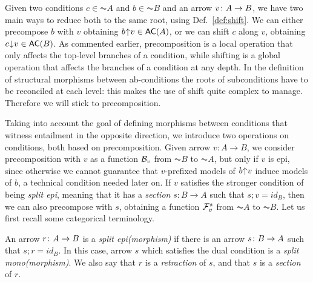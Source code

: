 Given two conditions $c\in \AC{A}$ and $b\in \AC{B}$ and an arrow $v\colon A \rightarrow B$, we have two main ways to reduce both to the same root, using Def.~\ref{def:shift}. We can either precompose $b$ with $v$ obtaining $\bshift{b}{v}\in \AC{A}$, or we can shift $c$ along $v$, obtaining $\shift{c}{v}\in \AC{B}$. As commented earlier, precomposition is a local operation that only affects the top-level branches of a condition, while shifting is a global operation that affects the branches of a condition at any depth. In the definition of structural morphisms between ab-conditions the roots of subconditions have to be reconciled at each level: this makes the use of shift quite complex to manage. Therefore we will stick to precomposition. 

Taking into account the goal of defining morphisms between conditions that witness entailment in the opposite direction, we introduce two operations on conditions, both based on precomposition. 
Given arrow $v:A\to B$, we consider precomposition with $v$ as a function $\mathcal{B}_v$ from $\AC{B}$ to $\AC{A}$, but only if $v$ is epi, since otherwise we cannot guarantee that $v$-prefixed models of ${b}{\mskip1mu\uparrow\mskip1mu}{v}$  induce models of $b$, a technical condition needed later on. If $v$ satisfies the stronger condition of being \emph{split epi}, meaning that it has a \emph{section} $s : B \to A$ such that $s;v= id_B$, then we can also precompose with $s$, obtaining a function $\mathcal{F}^s_v$ from $\AC{A}$ to $\AC{B}$. Let us first recall some categorical terminology.

\begin{definition}\label{def:retraction}
  An arrow $r\colon A \rightarrow B$  is a \emph{split epi(morphism)} if there is an arrow $s\colon B\rightarrow A$ such that $s;r = id_B$. In this case, arrow $s$ which satisfies the dual condition is a 
\emph{split mono(morphism)}. We also say that $r$ is a \emph{retraction} of $s$, and that $s$ is a \emph{section} of $r$.
\end{definition} 





